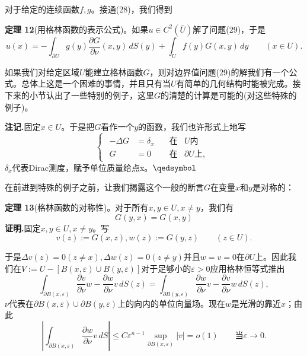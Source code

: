 \documentclass[leqno]{article}
\numberwithin{equation}{subsection}%
\begin{document}
对于给定的连续函数$f,g$。接通(28)，我们得到
\par
\noindent\textbf{定理 12}(用格林函数的表示公式)。如果$u\in C^{2}(\bar{U})$解了问题(29)，于是
\begin{equation}
u(x)=-\int_{\partial U}g(y)\frac{\partial G}{\partial\nu}(x,y)\,dS(y)+\int_{U}f(y)G(x,y)\,dy\qquad(x\in U).
\end{equation}
\par
如果我们对给定区域$U$能建立格林函数$G$，则对边界值问题(29)的解我们有一个公式。总体上这是一个困难的事情，并且只有当$U$有简单的几何结构时能被完成。接下来的小节认出了一些特别的例子，这里$G$的清楚的计算是可能的(对这些特殊的例子)。
\par
\noindent\textbf{注记.}固定$x\in U$。于是把$G$看作一个$y$的函数，我们也许形式上地写
\begin{equation*}
\begin{cases}
\begin{aligned}
-\Delta G&=\delta_{x}\quad&\text{在}&U\text{内}\\
G&=0&\text{在}&\partial U\text{上},
\end{aligned}
\end{cases}
\end{equation*}
$\delta_{x}$代表Dirac测度，赋予单位质量给点x。$\hfill\qedsymbol$
\par
在前进到特殊的例子之前，让我们揭露这个一般的断言$G$在变量$x$和$y$是对称的：
\par
\noindent\textbf{定理 13}(格林函数的对称性)。对于所有$x,y\in U,x\neq y$，我们有
\begin{equation*}
G(y,x)=G(x,y)
\end{equation*}
\textbf{证明.}固定$x,y\in U,x\neq y$。写
\begin{equation*}
v(z):=G(x,z),w(z):=G(y,z)\qquad(z\in U).
\end{equation*}
\par
于是$\Delta v(z)=0(z\neq x),\Delta w(z)=0(z\neq y)$并且$w=v=0$在$\partial U$上。因此我们在$V:=U-[B(x,\varepsilon)\cup B(y,\varepsilon)]$对于足够小的$\varepsilon>0$应用格林恒等式推出
\begin{equation}
\int_{\partial B(x,\varepsilon)}\frac{\partial v}{\partial \nu}w-\frac{\partial w}{\partial \nu}v\,dS(z)=\int_{\partial B(y,\varepsilon)}\frac{\partial w}{\partial\nu}v-\frac{\partial v}{\partial\nu}w\,dS(z),
\end{equation}
$\nu$代表在$\partial B(x,\varepsilon)\cup \partial B(y,\varepsilon)$上的向内的单位向量场。现在$w$是光滑的靠近$x$；由此
\begin{equation*}
\left|\int_{\partial B(x,\varepsilon)}\frac{\partial w}{\partial\nu}v\,dS\right|\leq C\varepsilon^{n-1}\sup_{\partial B(x,\varepsilon)}|v|=o(1)\qquad\text{当}\varepsilon\rightarrow 0.
\end{equation*}
\end{document}
